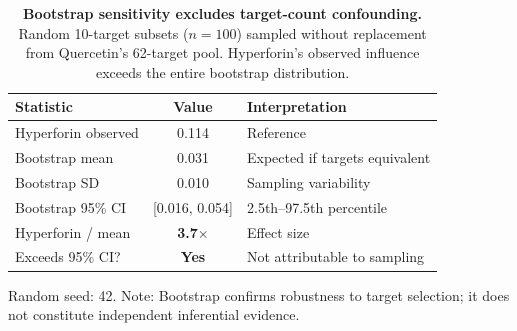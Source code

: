 \begin{table}[ht]
\centering
\caption{\textbf{Bootstrap sensitivity excludes target-count confounding.}
Random 10-target subsets ($n = 100$) sampled without replacement from Quercetin's 62-target pool.
Hyperforin's observed influence exceeds the entire bootstrap distribution.}
\label{tab:bootstrap}
\vspace{0.5em}
\begin{tabular}{@{}lcl@{}}
\toprule
\textbf{Statistic} & \textbf{Value} & \textbf{Interpretation} \\
\midrule
Hyperforin observed & 0.114 & Reference \\
\addlinespace
Bootstrap mean & 0.031 & Expected if targets equivalent \\
Bootstrap SD & 0.010 & Sampling variability \\
Bootstrap 95\% CI & [0.016, 0.054] & 2.5th--97.5th percentile \\
\addlinespace
Hyperforin / mean & \textbf{3.7}$\times$ & Effect size \\
Exceeds 95\% CI? & \textbf{Yes} & Not attributable to sampling \\
\bottomrule
\end{tabular}

\vspace{0.3em}
\begin{minipage}{\linewidth}
\footnotesize
Random seed: 42. Note: Bootstrap confirms robustness to target selection; it does not constitute independent inferential evidence.
\end{minipage}
\end{table}

